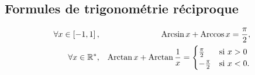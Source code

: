 \documentclass{magnolia}
\begin{document}
\subsection{Formules de trigonométrie réciproque}



\begin{proposition}[utile=-3]
\begin{eqnarray*}
\forall x\in\left[-1,1\right], & & \operatorname{Arcsin} x+\operatorname{Arccos} x=\frac{\pi}{2},\\
\forall x\in{\mathbb{R}^*}, & & \operatorname{Arctan} x+\operatorname{Arctan}\frac{1}{x}=
  \begin{cases}
  \frac{\pi}{2} & \text{si $x>0$}\\
  -\frac{\pi}{2} & \text{si $x<0$.} 
  \end{cases}
\end{eqnarray*}
\end{proposition}
\end{document}
